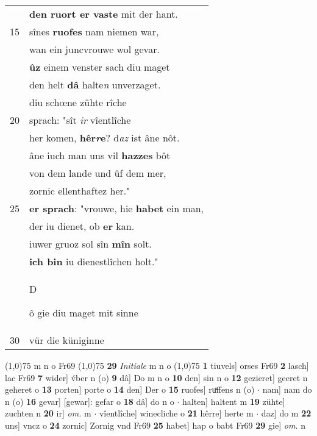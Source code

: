 \documentclass[8pt,a4paper,notitlepage]{article}
\begin{document}
\begin{table}[ht]
\begin{minipage}[t]{0.5\linewidth}
\begin{tabular}{rl}
 & \textbf{den ruort er vaste} mit der hant.\\ 
15 & sînes \textbf{ruofes} nam niemen war,\\ 
 & wan ein juncvrouwe wol gevar.\\ 
 & \textbf{ûz} einem venster sach diu maget\\ 
 & den helt \textbf{dâ} halte\textit{n} unverzaget.\\ 
 & diu schœne zühte rîche\\ 
20 & sprach: "sît \textit{ir} vîentlîche\\ 
 & her komen, \textbf{hêr\textit{r}e}? d\textit{az} ist âne nôt.\\ 
 & âne iuch man uns vil \textbf{hazzes} bôt\\ 
 & von dem lande und ûf dem mer,\\ 
 & zornic ellenthaftez her."\\ 
25 & \textbf{er sprach}: "vrouwe, hie \textbf{habet} ein man,\\ 
 & der iu dienet, ob \textbf{er} kan.\\ 
 & iuwer gruoz sol sîn \textbf{mîn} solt.\\ 
 & \textbf{ich bin} iu dienestlîchen holt."\\ 
 & \begin{large}D\end{large}ô gie diu maget mit sinne\\ 
30 & vür die küniginne\\ 
\end{tabular}
\scriptsize
\line(1,0){75} \newline
m n o Fr69 \newline
\line(1,0){75} \newline
\textbf{29} \textit{Initiale} m n o  \newline
\line(1,0){75} \newline
\textbf{1} tiuvels] orses Fr69 \textbf{2} lasch] lac Fr69 \textbf{7} wider] v́ber n (o) \textbf{9} dâ] Do m n o \textbf{10} den] sin n o \textbf{12} gezieret] geeret n geheret o \textbf{13} porten] porte o \textbf{14} den] Der o \textbf{15} ruofes] ruͯffens n (o)  $\cdot$ nam] nam do n (o) \textbf{16} gevar] [gewar]: gefar o \textbf{18} dâ] do n o  $\cdot$ halten] haltent m \textbf{19} zühte] zuchten n \textbf{20} ir] \textit{om.} m  $\cdot$ vîentlîche] winecliche o \textbf{21} hêrre] herte m  $\cdot$ daz] do m \textbf{22} uns] vncz o \textbf{24} zornic] Zornig vnd Fr69 \textbf{25} habet] hap o babt Fr69 \textbf{29} gie] \textit{om.} n \newline
\end{minipage}
\end{table}
\end{document}
